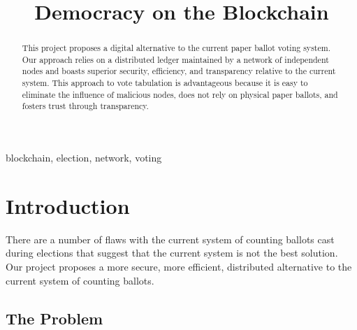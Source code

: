 \documentclass[conference]{IEEEtran}
\begin{document}
\title{Democracy on the Blockchain}

\author{
\and
{}
\and
{}
}

\maketitle

\begin{abstract}
This project proposes a digital alternative to the current paper ballot voting system. Our approach relies on a distributed ledger maintained by a network of independent nodes and boasts superior security, efficiency, and transparency relative to the current system. This approach to vote tabulation is advantageous because it is easy to eliminate the influence of malicious nodes, does not rely on physical paper ballots, and fosters trust through transparency.
\end{abstract}

\begin{IEEEkeywords}
blockchain, election, network, voting
\end{IEEEkeywords}

\section{Introduction}
There are a number of flaws with the current system of counting ballots cast during elections that suggest that the current system is not the best solution. Our project proposes a more secure, more efficient, distributed alternative to the current system of counting ballots.

\subsection{The Problem}
\end{document}
